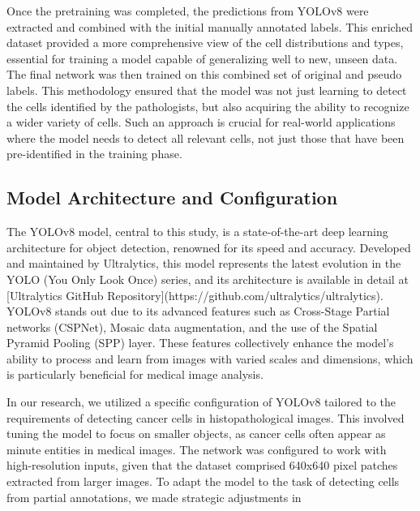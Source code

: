 \documentclass[anon]{midl} %
\begin{document}
Once the pretraining was completed, the predictions from YOLOv8 were extracted and combined with the initial manually annotated labels. This enriched dataset provided a more comprehensive view of the cell distributions and types, essential for training a model capable of generalizing well to new, unseen data. The final network was then trained on this combined set of original and pseudo labels. This methodology ensured that the model was not just learning to detect the cells identified by the pathologists, but also acquiring the ability to recognize a wider variety of cells. Such an approach is crucial for real-world applications where the model needs to detect all relevant cells, not just those that have been pre-identified in the training phase.

\subsection{Model Architecture and Configuration}
The YOLOv8 model, central to this study, is a state-of-the-art deep learning architecture for object detection, renowned for its speed and accuracy. Developed and maintained by Ultralytics, this model represents the latest evolution in the YOLO (You Only Look Once) series, and its architecture is available in detail at [Ultralytics GitHub Repository](https://github.com/ultralytics/ultralytics). YOLOv8 stands out due to its advanced features such as Cross-Stage Partial networks (CSPNet), Mosaic data augmentation, and the use of the Spatial Pyramid Pooling (SPP) layer. These features collectively enhance the model's ability to process and learn from images with varied scales and dimensions, which is particularly beneficial for medical image analysis.

In our research, we utilized a specific configuration of YOLOv8 tailored to the requirements of detecting cancer cells in histopathological images. This involved tuning the model to focus on smaller objects, as cancer cells often appear as minute entities in medical images. The network was configured to work with high-resolution inputs, given that the dataset comprised 640x640 pixel patches extracted from larger images. To adapt the model to the task of detecting cells from partial annotations, we made strategic adjustments in
\end{document}
